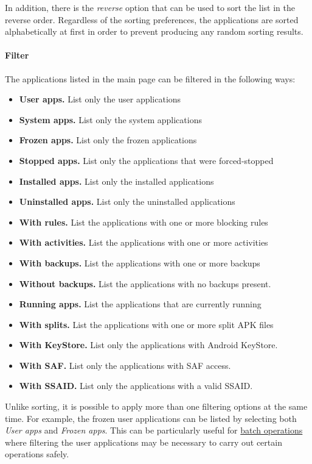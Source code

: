 In addition, there is the \textit{reverse} option that can be used to sort the list in the reverse order. Regardless of
the sorting preferences, the applications are sorted alphabetically at first in order to prevent producing any random
sorting results.

\paragraph{Filter}\hypertarget{par:main-page-filter}{} %
The applications listed in the main page can be filtered in the following ways:
\begin{itemize}
    \item \textbf{User apps.} List only the user applications
    \item \textbf{System apps.} List only the system applications
    \item \textbf{Frozen apps.} List only the frozen applications
    \item \textbf{Stopped apps.} List only the applications that were forced-stopped
    \item \textbf{Installed apps.} List only the installed applications
    \item \textbf{Uninstalled apps.} List only the uninstalled applications
    \item \textbf{With rules.} List the applications with one or more blocking rules
    \item \textbf{With activities.} List the applications with one or more activities
    \item \textbf{With backups.} List the applications with one or more backups
    \item \textbf{Without backups.} List the applications with no backups present.
    \item \textbf{Running apps.} List the applications that are currently running
    \item \textbf{With splits.} List the applications with one or more split APK files
    \item \textbf{With KeyStore.} List only the applications with Android KeyStore.
    \item \textbf{With SAF.} List only the applications with SAF access.
    \item \textbf{With SSAID.} List only the applications with a valid SSAID\@.
\end{itemize}

Unlike sorting, it is possible to apply more than one filtering options at the same time. For example, the frozen user
applications can be listed by selecting both \textit{User apps} and \textit{Frozen apps}. This can be particularly
useful for \hyperref[subsec:batch-operations]{batch operations} where filtering the user applications may be necessary
to carry out certain operations safely.

